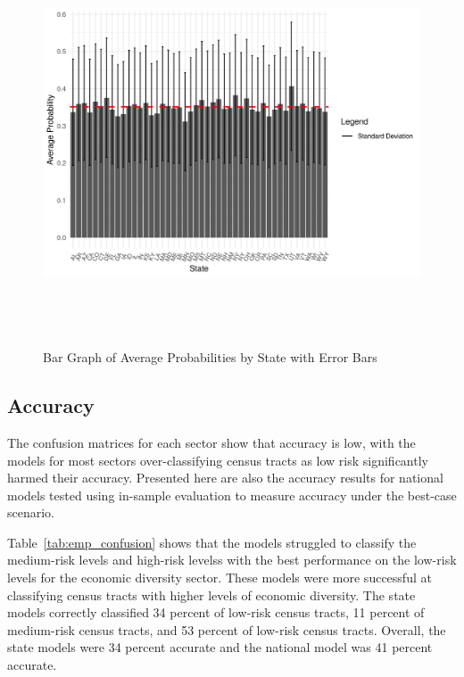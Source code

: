 \begin{figure}[htbp]
    \centering
     \includegraphics[width=1\textwidth, height=12cm]{plots/prob_state.png}
     \caption{Bar Graph of Average Probabilities by State with Error Bars}
     \label{fig:prob_sector}
 \end{figure}


\subsection{Accuracy}
The confusion matrices for each sector show that accuracy is low, with the models for most sectors over-classifying census tracts as low risk significantly harmed their accuracy. Presented here are also the accuracy results for national models tested using in-sample evaluation to measure accuracy under the best-case scenario. 

Table~\ref{tab:emp_confusion} shows that the models struggled to classify the medium-risk levels and high-risk levelss with the best performance on the low-risk levels for the economic diversity sector. These models were more successful at classifying census tracts with higher levels of economic diversity. The state models correctly classified 34 percent of low-risk census tracts, 11 percent of medium-risk census tracts, and 53 percent of low-risk census tracts. Overall, the state models were 34 percent accurate and the national model was 41 percent accurate. 

